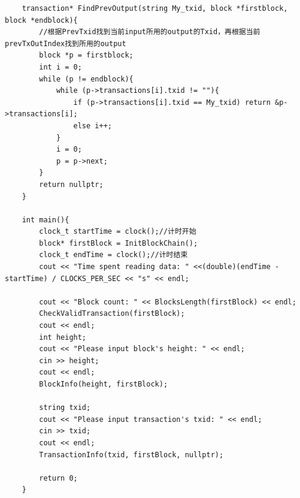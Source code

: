\documentclass[10pt,a4paper]{article}
\begin{document}
\begin{verbatim}
    transaction* FindPrevOutput(string My_txid, block *firstblock, block *endblock){
        //根据PrevTxid找到当前input所用的output的Txid，再根据当前prevTxOutIndex找到所用的output
        block *p = firstblock;
        int i = 0;
        while (p != endblock){
            while (p->transactions[i].txid != ""){
                if (p->transactions[i].txid == My_txid) return &p->transactions[i];      
                else i++;
            }
            i = 0;
            p = p->next;
        }
        return nullptr;
    }
    
    int main(){
        clock_t startTime = clock();//计时开始
        block* firstBlock = InitBlockChain();
        clock_t endTime = clock();//计时结束
        cout << "Time spent reading data: " <<(double)(endTime - startTime) / CLOCKS_PER_SEC << "s" << endl;
        
        cout << "Block count: " << BlocksLength(firstBlock) << endl;
        CheckValidTransaction(firstBlock);
        cout << endl;
        int height;
        cout << "Please input block's height: " << endl;
        cin >> height;
        cout << endl;
        BlockInfo(height, firstBlock);
    
        string txid;
        cout << "Please input transaction's txid: " << endl;
        cin >> txid;
        cout << endl;
        TransactionInfo(txid, firstBlock, nullptr);
    
        return 0;
    }
    \end{verbatim}
\end{document}
